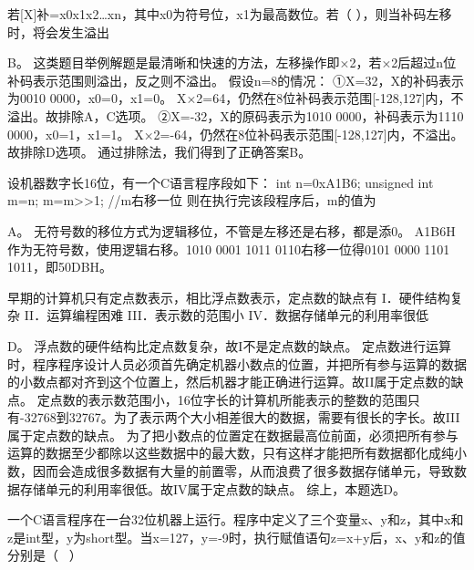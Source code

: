 \question 若{[}X{]}补=x0x1x2\ldots{}xn，其中x0为符号位，x1为最高数位。若（
），则当补码左移时，将会发生溢出
\par{}
\begin{solution}B。
这类题目举例解题是最清晰和快速的方法，左移操作即×2，若×2后超过n位补码表示范围则溢出，反之则不溢出。
假设n=8的情况： ①X=32，X的补码表示为0010 0000，x0=0，x1=0。
X×2=64，仍然在8位补码表示范围{[}-128,127{]}内，不溢出。故排除A，C选项。
②X=-32，X的原码表示为1010 0000，补码表示为1110 0000，x0=1，x1=1。
X×2=-64，仍然在8位补码表示范围{[}-128,127{]}内，不溢出。故排除D选项。
通过排除法，我们得到了正确答案B。
\end{solution}
\question 设机器数字长16位，有一个C语言程序段如下： int n=0xA1B6; unsigned int
m=n; m=m\textgreater{}\textgreater{}1; //m右移一位
则在执行完该段程序后，m的值为
\par{}
\begin{solution}A。 无符号数的移位方式为逻辑移位，不管是左移还是右移，都是添0。
A1B6H作为无符号数，使用逻辑右移。1010 0001 1011 0110右移一位得0101 0000
1101 1011，即50DBH。
\end{solution}
\question 早期的计算机只有定点数表示，相比浮点数表示，定点数的缺点有
I．硬件结构复杂 II．运算编程困难 III．表示数的范围小
IV．数据存储单元的利用率很低
\par{}
\begin{solution}D。 浮点数的硬件结构比定点数复杂，故I不是定点数的缺点。
定点数进行运算时，程序程序设计人员必须首先确定机器小数点的位置，并把所有参与运算的数据的小数点都对齐到这个位置上，然后机器才能正确进行运算。故II属于定点数的缺点。
定点数的表示数范围小，16位字长的计算机所能表示的整数的范围只有-32768到32767。为了表示两个大小相差很大的数据，需要有很长的字长。故III属于定点数的缺点。
为了把小数点的位置定在数据最高位前面，必须把所有参与运算的数据至少都除以这些数据中的最大数，只有这样才能把所有数据都化成纯小数，因而会造成很多数据有大量的前置零，从而浪费了很多数据存储单元，导致数据存储单元的利用率很低。故IV属于定点数的缺点。
综上，本题选D。
\end{solution}
\question 一个C语言程序在一台32位机器上运行。程序中定义了三个变量x、y和z，其中x和z是int型，y为short型。当x=127，y=-9时，执行赋值语句z=x+y后，x、y和z的值分别是（
~）
\par{}
